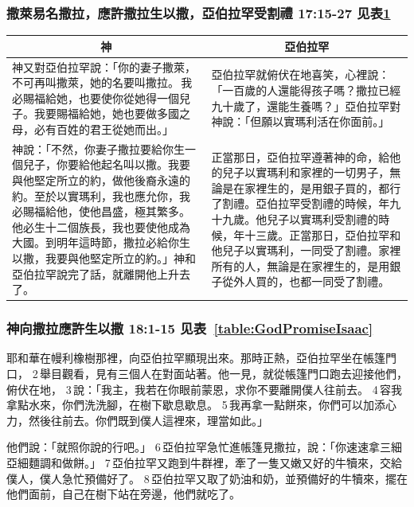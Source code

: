 \subsubsection{撒萊易名撒拉，應許撒拉生以撒，亞伯拉罕受割禮 17:15-27 见表\ref{table:GodPromisYBLH}}
\label{sec:GodPromisYBLH}
\begin{table}[H]
\centering
\begin{tabular}{p{9.25cm}|p{8.25cm}}\hline\hline
\multicolumn{1}{c|}{神}&\multicolumn{1}{c}{亞伯拉罕}\\\hline
神又對亞伯拉罕說：「你的妻子撒萊，不可再叫撒萊，她的名要叫撒拉。 我必賜福給她，也要使你從她得一個兒子。我要賜福給她，她也要做多國之母，必有百姓的君王從她而出。」&亞伯拉罕就俯伏在地喜笑，心裡說：「一百歲的人還能得孩子嗎？撒拉已經九十歲了，還能生養嗎？」亞伯拉罕對神說：「但願以實瑪利活在你面前。」\\\hline
神說：「不然，你妻子撒拉要給你生一個兒子，你要給他起名叫以撒。我要與他堅定所立的約，做他後裔永遠的約。至於以實瑪利，我也應允你，我必賜福給他，使他昌盛，極其繁多。他必生十二個族長，我也要使他成為大國。到明年這時節，撒拉必給你生以撒，我要與他堅定所立的約。」神和亞伯拉罕說完了話，就離開他上升去了。
&正當那日，亞伯拉罕遵著神的命，給他的兒子以實瑪利和家裡的一切男子，無論是在家裡生的，是用銀子買的，都行了割禮。亞伯拉罕受割禮的時候，年九十九歲。他兒子以實瑪利受割禮的時候，年十三歲。正當那日，亞伯拉罕和他兒子以實瑪利，一同受了割禮。家裡所有的人，無論是在家裡生的，是用銀子從外人買的，也都一同受了割禮。\\\hline
\end{tabular}
\label{table:GodPromisYBLH}
\end{table}



\subsubsection{神向撒拉應許生以撒 18:1-15 见表~\ref{table:GodPromiseIsaac}}
\label{sec:GodPromiseIsaac}
耶和華在幔利橡樹那裡，向亞伯拉罕顯現出來。那時正熱，亞伯拉罕坐在帳篷門口， 2 舉目觀看，見有三個人在對面站著。他一見，就從帳篷門口跑去迎接他們，俯伏在地， 3 說：「我主，我若在你眼前蒙恩，求你不要離開僕人往前去。 4 容我拿點水來，你們洗洗腳，在樹下歇息歇息。 5 我再拿一點餅來，你們可以加添心力，然後往前去。你們既到僕人這裡來，理當如此。」

他們說：「就照你說的行吧。」 6 亞伯拉罕急忙進帳篷見撒拉，說：「你速速拿三細亞細麵調和做餅。」 7 亞伯拉罕又跑到牛群裡，牽了一隻又嫩又好的牛犢來，交給僕人，僕人急忙預備好了。 8 亞伯拉罕又取了奶油和奶，並預備好的牛犢來，擺在他們面前，自己在樹下站在旁邊，他們就吃了。


